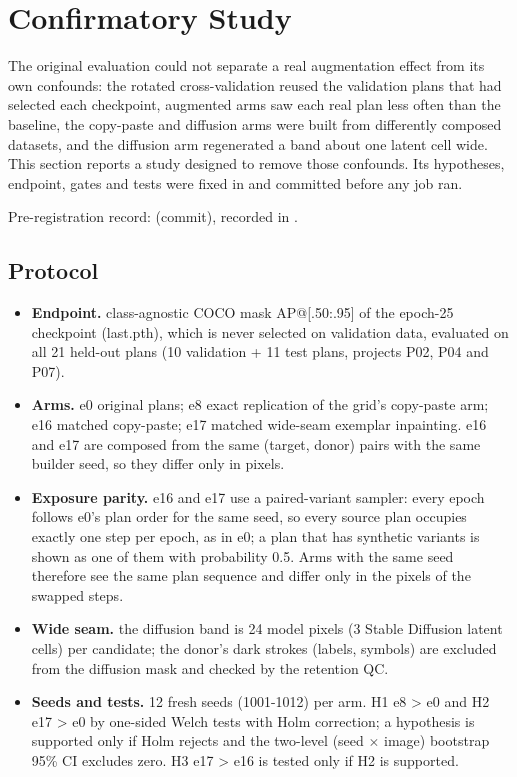 \section{Confirmatory Study}
\label{sec:confirm}

The original evaluation could not separate a real augmentation effect from its own confounds: the rotated cross-validation reused the validation plans that had selected each checkpoint, augmented arms saw each real plan less often than the baseline, the copy-paste and diffusion arms were built from differently composed datasets, and the diffusion arm regenerated a band about one latent cell wide. This section reports a study designed to remove those confounds. Its hypotheses, endpoint, gates and tests were fixed in  and committed before any job ran.

\noindent Pre-registration record:  (commit), recorded in .

\subsection{Protocol}
\begin{itemize}

  \item \textbf{Endpoint.} class-agnostic COCO mask AP@[.50:.95] of the epoch-25 checkpoint (last.pth), which is never selected on validation data, evaluated on all 21 held-out plans (10 validation + 11 test plans, projects P02, P04 and P07).
  \item \textbf{Arms.} e0 original plans; e8 exact replication of the grid's copy-paste arm; e16 matched copy-paste; e17 matched wide-seam exemplar inpainting. e16 and e17 are composed from the same (target, donor) pairs with the same builder seed, so they differ only in pixels.
  \item \textbf{Exposure parity.} e16 and e17 use a paired-variant sampler: every epoch follows e0's plan order for the same seed, so every source plan occupies exactly one step per epoch, as in e0; a plan that has synthetic variants is shown as one of them with probability 0.5. Arms with the same seed therefore see the same plan sequence and differ only in the pixels of the swapped steps.
  \item \textbf{Wide seam.} the diffusion band is 24 model pixels (3 Stable Diffusion latent cells) per candidate; the donor's dark strokes (labels, symbols) are excluded from the diffusion mask and checked by the retention QC.
  \item \textbf{Seeds and tests.} 12 fresh seeds (1001-1012) per arm. H1 e8 > e0 and H2 e17 > e0 by one-sided Welch tests with Holm correction; a hypothesis is supported only if Holm rejects and the two-level (seed $\times$ image) bootstrap 95\% CI excludes zero. H3 e17 > e16 is tested only if H2 is supported.
\end{itemize}

